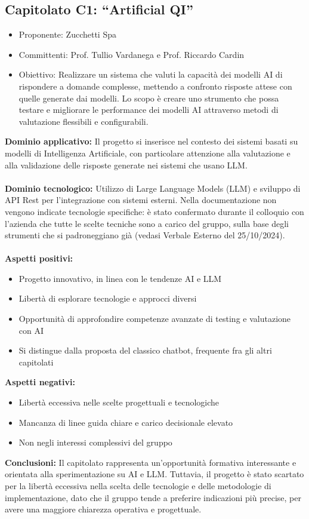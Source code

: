 \documentclass[10pt]{article}
\begin{document}
\subsection{Capitolato C1: “Artificial QI” }
\begin{itemize}
    \item Proponente: Zucchetti Spa
    \item Committenti: Prof. Tullio Vardanega e Prof. Riccardo Cardin
    \item Obiettivo: Realizzare un sistema che valuti la capacità dei modelli AI di rispondere a domande complesse, mettendo a confronto risposte attese con quelle generate dai modelli. Lo scopo è creare uno strumento che possa testare e migliorare le performance dei modelli AI attraverso metodi di valutazione flessibili e configurabili.
\end{itemize}
\textbf{Dominio applicativo:}
Il progetto si inserisce nel contesto dei sistemi basati su modelli di Intelligenza Artificiale, con particolare attenzione alla valutazione e alla validazione delle risposte generate nei sistemi che usano LLM.\\
\\
\textbf{Dominio tecnologico:}
Utilizzo di Large Language Models (LLM) e sviluppo di API Rest per l’integrazione con sistemi esterni. Nella documentazione non vengono indicate tecnologie specifiche: è stato confermato durante il colloquio con l’azienda che tutte le scelte tecniche sono a carico del gruppo, sulla base degli strumenti che si padroneggiano già (vedasi Verbale Esterno del 25/10/2024).\\
\\
\textbf{Aspetti positivi:}
\begin{itemize}
    \item Progetto innovativo, in linea con le tendenze AI e LLM
    \item Libertà di esplorare tecnologie e approcci diversi
    \item Opportunità di approfondire competenze avanzate di testing e valutazione con AI
    \item Si distingue dalla proposta del classico chatbot, frequente fra gli altri capitolati
\end{itemize}
\textbf{Aspetti negativi:}
\begin{itemize}
    \item Libertà eccessiva nelle scelte progettuali e tecnologiche
    \item Mancanza di linee guida chiare e carico decisionale elevato
    \item Non negli interessi complessivi del gruppo
\end{itemize}
\textbf{Conclusioni:}
Il capitolato rappresenta un’opportunità formativa interessante e orientata alla sperimentazione su AI e LLM. Tuttavia, il progetto è stato scartato per la libertà eccessiva nella scelta delle tecnologie e delle metodologie di implementazione, dato che il gruppo tende a preferire indicazioni più precise, per avere una maggiore chiarezza operativa e progettuale.
\end{document}

